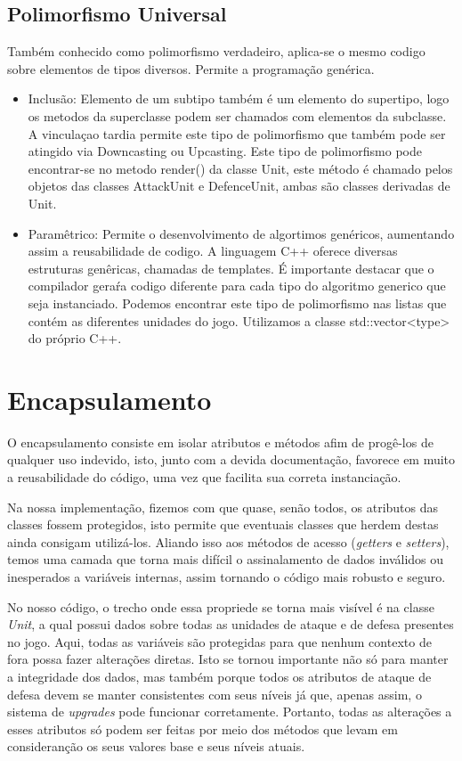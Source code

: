 \documentclass[rel_mlp]{iiufrgs}
\begin{document}
\subsection{Polimorfismo Universal}
 Também conhecido como polimorfismo verdadeiro, aplica-se o mesmo codigo sobre elementos de tipos diversos. Permite a programação genérica.
  \begin{itemize}
	\item Inclusão: Elemento de um subtipo também é um elemento do supertipo, logo os metodos da superclasse podem ser chamados com elementos da subclasse. A vinculaçao tardia permite este tipo de polimorfismo que também pode ser atingido via Downcasting ou Upcasting.
	Este tipo de polimorfismo pode encontrar-se no metodo render() da classe Unit, este método é chamado pelos objetos das classes AttackUnit e DefenceUnit, ambas são classes derivadas de Unit.
	\item Paramêtrico: Permite o desenvolvimento de algortimos genéricos, aumentando assim a reusabilidade de codigo. A linguagem C++ oferece diversas estruturas genêricas, chamadas de templates. É importante destacar que o compilador geraŕa codigo diferente para cada tipo do algoritmo generico  que seja instanciado. Podemos encontrar este tipo de polimorfismo nas listas que contém as diferentes unidades do jogo. Utilizamos a classe std::vector<type> do próprio C++.
 \end{itemize}


\section{Encapsulamento}

	O encapsulamento consiste em isolar atributos e métodos afim de progê-los de qualquer uso indevido, isto, junto com a devida documentação, favorece em muito a reusabilidade do código, uma vez que facilita sua correta instanciação.

	Na nossa implementação, fizemos com que quase, senão todos, os atributos das classes fossem protegidos, isto permite que eventuais classes que herdem destas ainda consigam utilizá-los. Aliando isso aos métodos de acesso (\textit{getters} e \textit{setters}), temos uma camada que torna mais difícil o assinalamento de dados inválidos ou inesperados a variáveis internas, assim tornando o código mais robusto e seguro.

 	No nosso código, o trecho onde essa propriede se torna mais visível é na classe \textit{Unit}, a qual possui dados sobre todas as unidades de ataque e de defesa presentes no jogo. Aqui, todas as variáveis são protegidas para que nenhum contexto de fora possa fazer alterações diretas. Isto se tornou importante não só para manter a integridade dos dados, mas também porque todos os atributos de ataque de defesa devem se manter consistentes com seus níveis já que, apenas assim, o sistema de \textit{upgrades} pode funcionar corretamente. Portanto, todas as alterações a esses atributos só podem ser feitas por meio dos métodos que levam em consideranção os seus valores base e seus níveis atuais.
\end{document}
